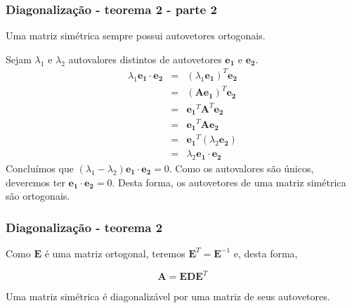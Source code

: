 \begin{frame}[allowframebreaks]
  \frametitle{Diagonalização - teorema 2 - parte 2}
  Uma matriz simétrica sempre possui autovetores ortogonais.

  Sejam $\lambda_1$ e $\lambda_2$ autovalores distintos de autovetores $\mathbf{e_1}$ e $\mathbf{e_2}$.
  \begin{eqnarray}
  \lambda_1 \mathbf{e_1} \cdot \mathbf{e_2} &=& (\lambda_1 \mathbf{e_1})^T \mathbf{e_2} \nonumber \\
                                            &=& \left( \mathbf{A} \mathbf{e_1}\right)^T \mathbf{e_2} \nonumber \\
                                            &=& \mathbf{e_1}^T \mathbf{A}^T \mathbf{e_2} \nonumber \\
                                            &=& \mathbf{e_1}^T \mathbf{A} \mathbf{e_2} \nonumber \\
                                            &=& \mathbf{e_1}^T (\lambda_2 \mathbf{e_2}) \nonumber \\
                                            &=& \lambda_2 \mathbf{e_1} \cdot \mathbf{e_2}
  \end{eqnarray}
  Concluímos que $(\lambda_1 - \lambda_2) \mathbf{e_1} \cdot \mathbf{e_2} = 0$. Como os autovalores são únicos,
  deveremos ter $\mathbf{e_1} \cdot \mathbf{e_2} = 0$. Desta forma, os autovetores de uma matriz simétrica são ortogonais.
\end{frame} 

\begin{frame}[allowframebreaks]
  \frametitle{Diagonalização - teorema 2}
  Como $\mathbf{E}$ é uma matriz ortogonal, teremos $\mathbf{E}^{T} = \mathbf{E}^{-1}$ e, desta forma,

  \begin{equation}
  \mathbf{A} = \mathbf{E} \mathbf{D} \mathbf{E}^{T}
  \end{equation}

  Uma matriz simétrica é diagonalizável por uma matriz de seus autovetores.
\end{frame}
 
